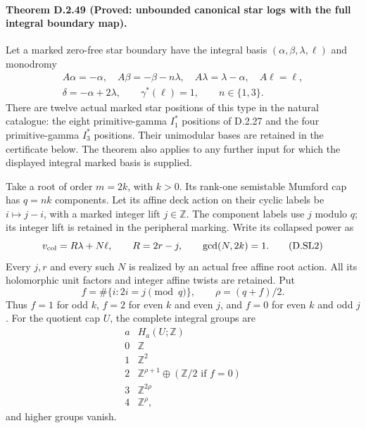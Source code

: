 \paragraph{Theorem D.2.49 (Proved: unbounded canonical star logs with the full integral boundary map).}
Let a marked zero-free star boundary have the integral basis
$(\alpha,\beta,\lambda,\ell)$ and monodromy
\[
\begin{gathered}
 A\alpha=-\alpha,\quad A\beta=-\beta-n\lambda,\quad
 A\lambda=\lambda-\alpha,\quad A\ell=\ell,\\
 \delta=-\alpha+2\lambda,\qquad\gamma^*(\ell)=1,
 \qquad n\in\{1,3\}.
\end{gathered}                                               \tag{D.SL1}
\]
There are twelve actual marked star positions of this type
in the natural catalogue: the eight primitive-gamma $I_1^*$
positions of D.2.27 and the four primitive-gamma $I_3^*$
positions. Their unimodular bases are retained in the
certificate below. The theorem also applies to any further
input for which the displayed integral marked basis is supplied.

Take a root of order $m=2k$, with $k>0$. Its rank-one
semistable Mumford cap has $q=nk$ components. Let its affine
deck action on their cyclic labels be
$i\mapsto j-i$, with a marked integer lift $j\in\mathbb Z$.
The component labels use $j$ modulo $q$; its integer lift is
retained in the peripheral marking. Write its collapsed
power as
\[
 v_{\rm col}=R\lambda+N\ell,\qquad R=2r-j,
                \qquad \gcd(N,2k)=1 .                     \tag{D.SL2}
\]
Every $j,r$ and every such $N$ is realized by an actual free
affine root action. All its holomorphic unit factors and
integer affine twists are retained. Put
\[
 f=\#\{i:2i=j\pmod q\},\qquad \rho=(q+f)/2.
\]
Thus $f=1$ for odd $k$, $f=2$ for even $k$ and even $j$,
and $f=0$ for even $k$ and odd $j$.
For the quotient cap $U$, the complete integral groups are
\[
\begin{array}{c|c}
a&H_a(U;\mathbb Z)\\\hline
0&\mathbb Z\\
1&\mathbb Z^2\\
2&\mathbb Z^{\rho+1}\oplus
                    (\mathbb Z/2\text{ if }f=0)\\
3&\mathbb Z^{2\rho}\\
4&\mathbb Z^\rho,
\end{array}                                                \tag{D.SL3}
\]
and higher groups vanish.

